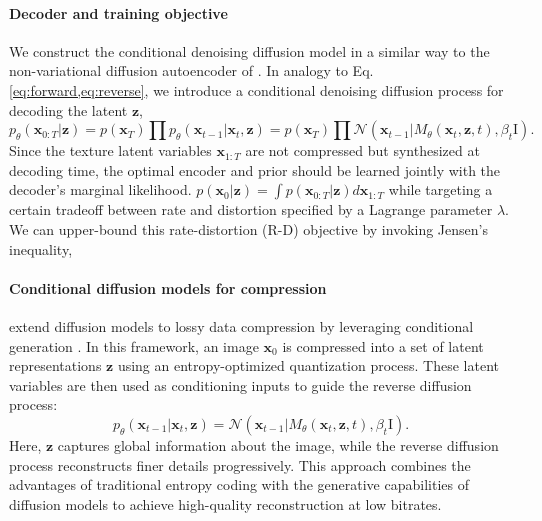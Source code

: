 \paragraph{\textbf{ Decoder and training objective}} We construct the conditional denoising diffusion model in a similar way to the non-variational diffusion autoencoder of \cite{Preechakul2021,Wang2023info}. In analogy to Eq. \eqref{eq:forward,eq:reverse}, we introduce a conditional denoising diffusion process for decoding the latent $\boldsymbol{z}$,
\begin{equation}
    p_\theta\left(\boldsymbol{x}_{0:T}|\boldsymbol{z}\right)=p\left(\boldsymbol{x}_T\right)\prod p_{\theta} \left(\boldsymbol{x}_{t-1}|\boldsymbol{x}_{t},\boldsymbol{z}\right)=p\left(\boldsymbol{x}_T\right)\prod \mathcal{N}\left(\boldsymbol{x}_{t-1}|M_\theta\left(\boldsymbol{x}_t,\boldsymbol{z},t\right),\beta_t\boldsymbol{\mathrm{I}}\right).
\end{equation}
Since the texture latent variables $\boldsymbol{x}_{1:T}$ are not compressed but synthesized at decoding time, the optimal encoder and prior should be learned jointly with the decoder’s marginal likelihood. $p\left(\boldsymbol{x}_{0}|\boldsymbol{z}\right)=\int p\left(\boldsymbol{x}_{0:T}|\boldsymbol{z}\right)d\boldsymbol{x}_{1:T}$ while targeting a certain tradeoff between rate and distortion specified by a Lagrange parameter $\lambda$. We can upper-bound this rate-distortion (R-D) objective by invoking Jensen’s inequality,

\paragraph{\textbf{Conditional diffusion models for compression}} extend diffusion models to lossy data compression by leveraging conditional generation \cite{Yang2023cd}. In this framework, an image $\boldsymbol{x}_0$ is compressed into a set of latent representations $\boldsymbol{z}$ using an entropy-optimized quantization process. These latent variables are then used as conditioning inputs to guide the reverse diffusion process:
\begin{equation}
    p_\theta\left(\boldsymbol{x}_{t-1}|\boldsymbol{x}_t, \boldsymbol{z}\right)=\mathcal{N}\left(\boldsymbol{x}_{t-1}|M_\theta\left(\boldsymbol{x}_t, \boldsymbol{z}, t\right),\beta_t\boldsymbol{\mathrm{I}}\right).
\end{equation}
Here, $\boldsymbol{z}$ captures global information about the image, while the reverse diffusion process reconstructs finer details progressively. This approach combines the advantages of traditional entropy coding with the generative capabilities of diffusion models to achieve high-quality reconstruction at low bitrates.

